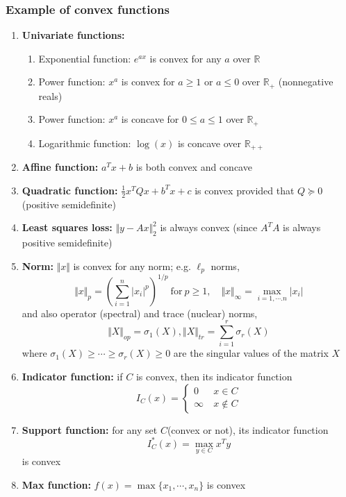 \documentclass[a4paper]{article}
\begin{document}
{\subsubsection{Example of convex functions}
\begin{enumerate}
  \item \textbf{Univariate functions:}
  \begin{enumerate}
    \item Exponential function: $e^{ax}$ is convex for any $a$ over $\mathbb{R}$
    \item Power function: $x^a$ is convex for $a \geq 1$ or $a \leq 0$ over $\mathbb{R}_+$ (nonnegative reals)
    \item Power function: $x^a$ is concave for $0 \leq a \leq 1$ over $\mathbb{R}_+$
    \item Logarithmic function: $\log (x)$ is concave over $\mathbb{R}_{++}$  
  \end{enumerate}
  \item \textbf{Affine function:} $a^T x + b$ is both convex and concave
  \item \textbf{Quadratic function:} $\frac{1}{2} x^T Q x + b^T x + c$ is convex provided that $Q \succeq 0$ (positive semidefinite)
  \item \textbf{Least squares loss:} $\Vert y - Ax \Vert^2_2$ is always convex (since $A^T A$ is always positive semidefinite) 
  \item \textbf{Norm:} $\Vert x \Vert$ is convex for any norm; e.g. $\ell_p$ norms,
  \[
    \Vert x \Vert_p = (\sum_{i=1}^n |x_i|^p)^{1/p} \ \text{for} \ p \geq 1, \quad \Vert x \Vert_\infty = \max\limits_{i=1,\cdots.n}|x_i|
  \]
  and also operator (spectral) and trace (nuclear) norms,
  \[
    \Vert X \Vert_{op} = \sigma_1(X), \Vert X \Vert_{tr} = \sum_{i=1}^r \sigma_r(X)
  \]
  where $\sigma_1(X) \geq \cdots \geq \sigma_r(X) \geq 0$ are the singular values of the matrix $X$
  \item \textbf{Indicator function:} if $C$ is convex, then its indicator function
  \[
    I_C(x) = 
    \begin{cases}
      0 &\ x \in C \\
      \infty &\ x \notin C
    \end{cases}
  \]
  \item \textbf{Support function:} for any set $C$(convex or not), its indicator function 
  \[
    I_C^*(x) = \max\limits_{y \in C} x^T y  
  \]
  is convex 
  \item \textbf{Max function:} $f(x) = \max \{ x_1, \cdots, x_n \}$ is convex 


\end{enumerate}}
\end{document}

